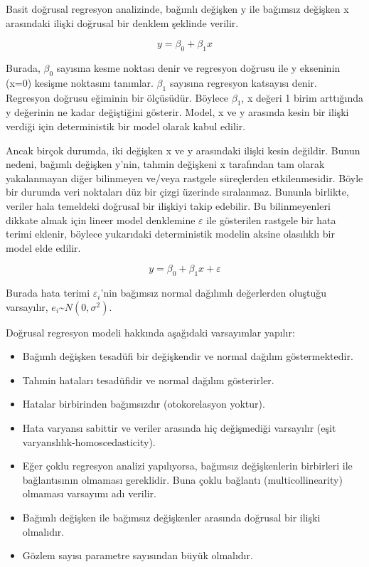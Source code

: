 \documentclass[
  letterpaper,
  DIV=11,
  numbers=noendperiod]{scrreprt}
\begin{document}
Basit doğrusal regresyon analizinde, bağımlı değişken y ile bağımsız
değişken x arasındaki ilişki doğrusal bir denklem şeklinde verilir.

\[ y=\beta_0+\beta_1x \]

Burada, \(\beta_0\) sayısına kesme noktası denir ve regresyon doğrusu
ile y ekseninin (x=0) kesişme noktasını tanımlar. \(\beta_1\) sayısına
regresyon katsayısı denir. Regresyon doğrusu eğiminin bir ölçüsüdür.
Böylece \(\beta_1\), x değeri 1 birim arttığında y değerinin ne kadar
değiştiğini gösterir. Model, x ve y arasında kesin bir ilişki verdiği
için deterministik bir model olarak kabul edilir.

Ancak birçok durumda, iki değişken x ve y arasındaki ilişki kesin
değildir. Bunun nedeni, bağımlı değişken y'nin, tahmin değişkeni x
tarafından tam olarak yakalanmayan diğer bilinmeyen ve/veya rastgele
süreçlerden etkilenmesidir. Böyle bir durumda veri noktaları düz bir
çizgi üzerinde sıralanmaz. Bununla birlikte, veriler hala temeldeki
doğrusal bir ilişkiyi takip edebilir. Bu bilinmeyenleri dikkate almak
için lineer model denklemine \(\varepsilon\) ile gösterilen rastgele bir
hata terimi eklenir, böylece yukarıdaki deterministik modelin aksine
olasılıklı bir model elde edilir.

\[ y=\beta_0+\beta_1x+\varepsilon \]

Burada hata terimi \(\varepsilon_i\)'nin bağımsız normal dağılımlı
değerlerden oluştuğu varsayılır,
\(e_i\)\textasciitilde{}\(N(0,\sigma^2)\).

Doğrusal regresyon modeli hakkında aşağıdaki varsayımlar yapılır:

\begin{itemize}
\item
  Bağımlı değişken tesadüfi bir değişkendir ve normal dağılım
  göstermektedir.
\item
  Tahmin hataları tesadüfidir ve normal dağılım gösterirler.
\item
  Hatalar birbirinden bağımsızdır (otokorelasyon yoktur).
\item
  Hata varyansı sabittir ve veriler arasında hiç değişmediği varsayılır
  (eşit varyanslılık-homoscedasticity).
\item
  Eğer çoklu regresyon analizi yapılıyorsa, bağımsız değişkenlerin
  birbirleri ile bağlantısının olmaması gereklidir. Buna çoklu bağlantı
  (multicollinearity) olmaması varsayımı adı verilir.
\item
  Bağımlı değişken ile bağımsız değişkenler arasında doğrusal bir ilişki
  olmalıdır.
\item
  Gözlem sayısı parametre sayısından büyük olmalıdır.
\end{itemize}
\end{document}
